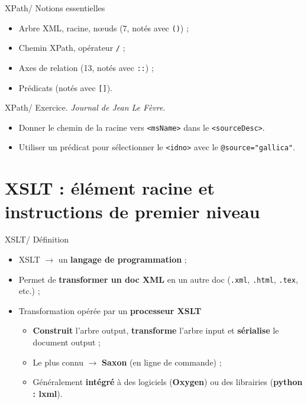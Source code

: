 \documentclass{beamer}
\begin{document}
    \begin{frame}{XPath/ Notions essentielles}
        \Large
        \begin{itemize}
            \item Arbre XML, racine, n\oe uds (7, notés avec \texttt{()}) ;
            \item Chemin XPath, opérateur \texttt{/} ;
            \item Axes de relation (13, notés avec \texttt{::}) ;
            \item Prédicats (notés avec \texttt{[]}).
        \end{itemize}
    \end{frame}

    \begin{frame}{XPath/ Exercice. \textit{Journal de Jean Le Fèvre}.}
        \Large
        \begin{itemize}
            \item Donner le chemin de la racine vers \texttt{<msName>} dans le \texttt{<sourceDesc>}.
            \bigskip
            \item Utiliser un prédicat pour sélectionner le \texttt{<idno>} avec le \texttt{@source="gallica"}.
        \end{itemize}
    \end{frame}

    \section{XSLT : élément racine et instructions de premier niveau}

    \begin{frame}{XSLT/ Définition}
        \Large
        \begin{itemize}
            \item XSLT $\rightarrow$ un \textbf{langage de programmation} ;
            \bigskip
            \item Permet de \textbf{transformer un doc XML} en un autre doc  (\texttt{.xml}, \texttt{.html}, \texttt{.tex}, etc.) ;
            \bigskip
            \item Transformation opérée par un \textbf{processeur XSLT}
            \begin{itemize}
                \item \textbf{Construit} l'arbre output, \textbf{transforme} l'arbre input et \textbf{sérialise} le document output ;
                \item Le plus connu $\rightarrow$ \textbf{Saxon} (en ligne de commande) ;
                \item Généralement \textbf{intégré} à des logiciels (\textbf{Oxygen}) ou des librairies (\textbf{python : lxml}).
            \end{itemize}
        \end{itemize}
    \end{frame}
\end{document}
